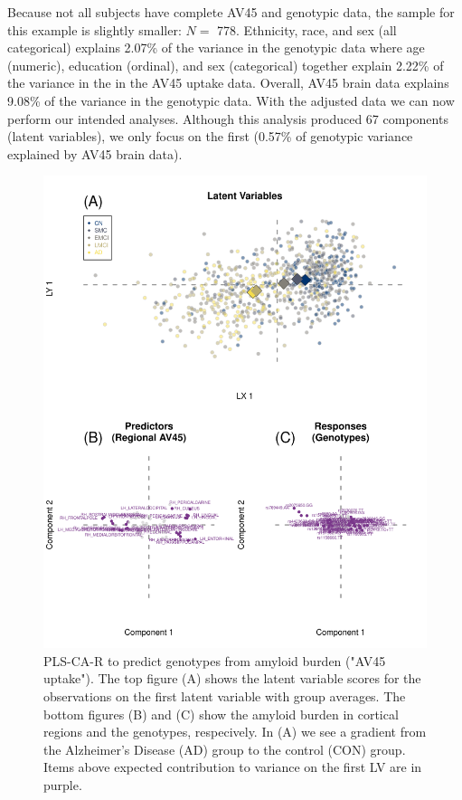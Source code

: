 \documentclass[12pt]{article}
\begin{document}
Because not all subjects have complete AV45 and genotypic data, the
sample for this example is slightly smaller: \(N=\) 778. Ethnicity,
race, and sex (all categorical) explains 2.07\% of the variance in the
genotypic data where age (numeric), education (ordinal), and sex
(categorical) together explain 2.22\% of the variance in the in the AV45
uptake data. Overall, AV45 brain data explains 9.08\% of the variance in
the genotypic data. With the adjusted data we can now perform our
intended analyses. Although this analysis produced 67 components (latent
variables), we only focus on the first (0.57\% of genotypic variance
explained by AV45 brain data).

\begin{figure}[!hbtp]

{\centering \includegraphics[width=.8\textwidth,height=.8\textheight]{PLSCAR_to_a_GPLS_files/figure-latex/unnamed-chunk-12-1} 

}

\caption{\label{fig:brain_genotypes_ex2} PLS-CA-R to predict genotypes from amyloid burden ("AV45 uptake"). The top figure (A) shows the latent variable scores for the observations on the first latent variable with group averages. The bottom figures (B) and (C) show the amyloid burden in cortical regions and the genotypes, respecively. In (A) we see a gradient from the Alzheimer's Disease (AD) group to the control (CON) group. Items above expected contribution to variance on the first LV are in purple.}\label{fig:unnamed-chunk-12}
\end{figure}
\end{document}

